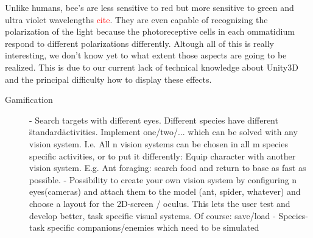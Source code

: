 \documentclass{acm_proc_article-sp}
\newcommand{\todo}[1]{\textcolor{Red}{#1}}
\begin{document}
Unlike humans, bee's are less sensitive to red but more sensitive to green and
ultra violet wavelengths \todo{cite}. They are even capable of recognizing the
polarization of the light because the photoreceptive cells in each ommatidium
respond to different polarizations differently.
Altough all of this is really interesting, we don't know yet to what extent those
aspects are going to be realized. This is due to our current lack of technical
knowledge about Unity3D and the principal difficulty how to display these
effects.

\begin{description}


\item[Gamification]
- Search targets with different eyes. Different species have different
  \"standard\" activities.
  Implement one/two/... which can be solved with any vision system.
  I.e. All n vision systems can be chosen in all m species specific activities,
  or to put it differently: Equip character with another vision system.
  E.g. Ant foraging: search food and return to base as fast as possible.
- Possibility to create your own vision system by configuring n eyes(cameras)
  and attach them to the model (ant, spider, whatever) and choose a layout
  for the 2D-screen / oculus.
  This lets the user test and develop better, task specific visual systems.
  Of course: save/load
- Species-task specific companions/enemies which need to be simulated


\end{description}
\end{document}
